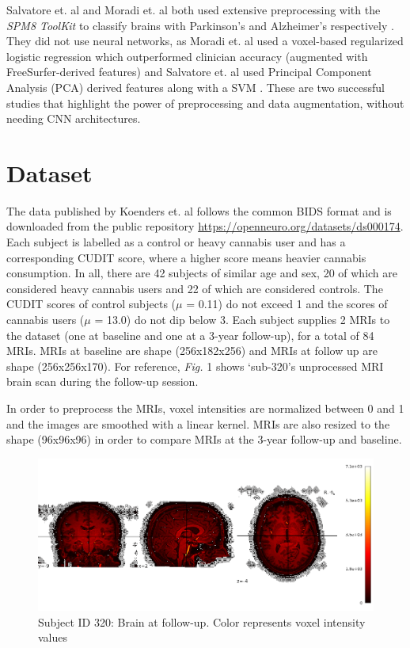 \documentclass[conference]{IEEEtran}
\begin{document}
Salvatore et. al and Moradi et. al both used extensive preprocessing with the \textit{SPM8 ToolKit} to classify brains with Parkinson's and Alzheimer's respectively \cite{b9} \cite{Moradi}. They did not use neural networks, as Moradi et. al used a voxel-based regularized logistic regression which outperformed clinician accuracy (augmented with FreeSurfer-derived features) and Salvatore et. al used Principal Component Analysis (PCA) derived features along with a SVM \cite{b9} \cite{Moradi}. These are two successful studies that highlight the power of preprocessing and data augmentation, without needing CNN architectures. 

\section{Dataset}

The data published by Koenders et. al follows the common BIDS format and is downloaded from the public repository \url{https://openneuro.org/datasets/ds000174}. Each subject is labelled as a control or heavy cannabis user and has a corresponding CUDIT score, where a higher score means heavier cannabis consumption. In all, there are 42 subjects of similar age and sex, 20 of which are considered heavy cannabis users and 22 of which are considered controls. The CUDIT scores of control subjects ($\mu{}$ = 0.11) do not exceed 1 and the scores of cannabis users ($\mu{}$ = 13.0) do not dip below 3. Each subject supplies 2 MRIs to the dataset  (one at baseline and one at a 3-year follow-up), for a total of 84 MRIs. MRIs at baseline are shape (256x182x256) and MRIs at follow up are shape (256x256x170). For reference, \textit{Fig.} 1 shows ‘sub-320’s unprocessed MRI brain scan during the follow-up session. 

In order to preprocess the MRIs, voxel intensities are normalized between 0 and 1 and the images are smoothed with a linear kernel. MRIs are also resized to the shape (96x96x96) in order to compare MRIs at the 3-year follow-up and baseline. 

\begin{figure}[htbp!]
\centerline{\includegraphics[scale = 0.45]{Picture2.png}}
\caption{Subject ID 320: Brain at follow-up. Color represents voxel intensity values}
\label{Picture2}
\end{figure}
\end{document}
